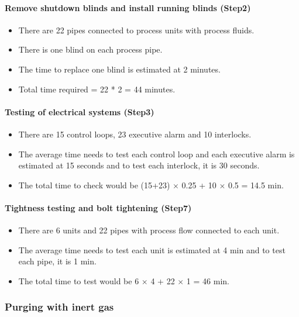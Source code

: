 \paragraph{Remove shutdown blinds and install running blinds (Step2)}
    \begin{itemize}
        \item There are 22 pipes connected to process units with process fluids.
        \item There is one blind on each process pipe.
        \item The time to replace one blind is estimated at 2 minutes.
        \item Total time required = 22 * 2 = 44 minutes.
    \end{itemize}
    
\paragraph{Testing of electrical systems (Step3)}
 \begin{itemize}
        \item There are 15 control loops, 23 executive alarm and 10 interlocks.
        \item The average time needs to test each control loop and each executive alarm is estimated at 15 seconds and to test each interlock, it is 30 seconds.
        \item The total time to check would be (15+23) $\times$ 0.25 + 10 $\times$ 0.5 = 14.5 min.
    \end{itemize}
    
\paragraph{Tightness testing and bolt tightening (Step7)}
 \begin{itemize}
        \item There are 6 units and 22 pipes with process flow connected to each unit.
        \item The average time needs to test each unit is estimated at 4 min and to test each pipe, it is 1 min.
        \item The total time to test would be 6 $\times$ 4 + 22 $\times$ 1 = 46 min.
    \end{itemize}
    
\subsubsection{Purging with inert gas}

